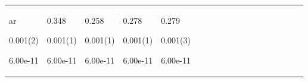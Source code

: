 \begin{longtable}{|p{0.01cm}|p{0.25cm}p{0.25cm}p{0.25cm}p{0.25cm}p{0.25cm}p{0.25cm}p{0.25cm}p{0.25cm}p{0.25cm}p{0.25cm}p{0.25cm}p{0.25cm}p{0.25cm}p{0.25cm}p{0.25cm}p{0.25cm}p{0.25cm}|}
ar{\tiny \parbox{1cm}{\hspace{-0.17cm}0.001(2)}}\par{\tiny \parbox{1cm}{\hspace{-0.17cm}6.00e-11}} & \par{\tiny \parbox{1cm}{\hspace{-0.17cm}0.348}}\par{\tiny \parbox{1cm}{\hspace{-0.17cm}0.001(1)}}\par{\tiny \parbox{1cm}{\hspace{-0.17cm}6.00e-11}} & \par{\tiny \parbox{1cm}{\hspace{-0.17cm}0.258}}\par{\tiny \parbox{1cm}{\hspace{-0.17cm}0.001(1)}}\par{\tiny \parbox{1cm}{\hspace{-0.17cm}6.00e-11}} & \par{\tiny \parbox{1cm}{\hspace{-0.17cm}0.278}}\par{\tiny \parbox{1cm}{\hspace{-0.17cm}0.001(1)}}\par{\tiny \parbox{1cm}{\hspace{-0.17cm}6.00e-11}} & \par{\tiny \parbox{1cm}{\hspace{-0.17cm}0.279}}\par{\tiny \parbox{1cm}{\hspace{-0.17cm}0.001(3)}}\par{\tiny \parbox{1cm}{\hspace{-0.17cm}6.00e-11}}\\

\end{longtable}

